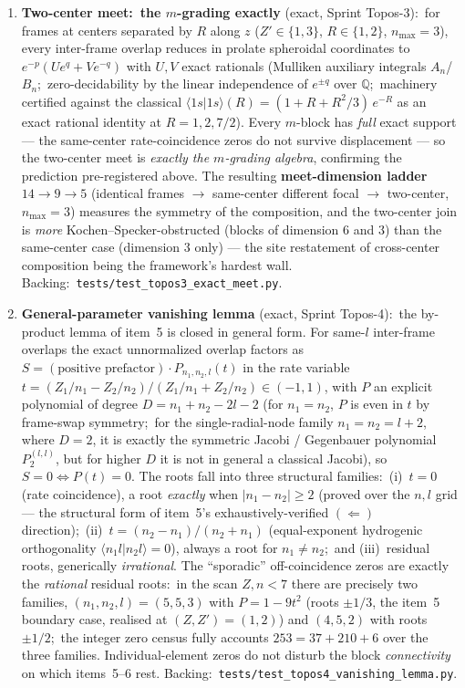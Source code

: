 \documentclass[11pt,a4paper]{article}
\theoremstyle{plain}
\theoremstyle{definition}
\newcommand{\Q}{\mathbb{Q}}
\begin{document}
\begin{enumerate}
  \item \textbf{Two-center meet:\ the $m$-grading exactly} (exact,
    Sprint Topos-3):\ for frames at centers separated by $R$ along $z$
    ($Z' \in \{1, 3\}$, $R \in \{1, 2\}$, $n_{\max} = 3$), every
    inter-frame overlap reduces in prolate spheroidal coordinates to
    $e^{-p}(U e^{q} + V e^{-q})$ with $U, V$ exact rationals
    (Mulliken auxiliary integrals $A_n$/$B_n$;\ zero-decidability by
    the linear independence of $e^{\pm q}$ over $\Q$;\ machinery
    certified against the classical $\langle 1s|1s\rangle(R) =
    (1 + R + R^2/3)\,e^{-R}$ as an exact rational identity at
    $R = 1, 2, 7/2$).  Every $m$-block has \emph{full} exact support
    --- the same-center rate-coincidence zeros do not survive
    displacement --- so the two-center meet is \emph{exactly the
    $m$-grading algebra}, confirming the prediction pre-registered
    above.  The resulting \textbf{meet-dimension ladder}
    $14 \to 9 \to 5$ (identical frames $\to$ same-center different
    focal $\to$ two-center, $n_{\max} = 3$) measures the symmetry of
    the composition, and the two-center join is \emph{more}
    Kochen--Specker-obstructed (blocks of dimension $6$ and $3$) than
    the same-center case (dimension $3$ only) --- the site restatement
    of cross-center composition being the framework's hardest wall.
    Backing:\ \texttt{tests/test\_topos3\_exact\_meet.py}.
  \item \textbf{General-parameter vanishing lemma} (exact, Sprint
    Topos-4):\ the by-product lemma of item~5 is closed in general
    form.  For same-$l$ inter-frame overlaps the exact unnormalized
    overlap factors as $S = (\text{positive prefactor}) \cdot
    P_{n_1, n_2, l}(t)$ in the rate variable
    $t = (Z_1/n_1 - Z_2/n_2)/(Z_1/n_1 + Z_2/n_2) \in (-1, 1)$, with
    $P$ an explicit polynomial of degree $D = n_1 + n_2 - 2l - 2$
    (for $n_1 = n_2$, $P$ is even in $t$ by frame-swap symmetry;\ for
    the single-radial-node family $n_1 = n_2 = l + 2$, where $D = 2$, it
    is exactly the symmetric Jacobi / Gegenbauer polynomial $P_2^{(l,l)}$,
    but for higher $D$ it is not in general a classical Jacobi), so
    $S = 0 \Leftrightarrow P(t) = 0$.  The roots
    fall into three structural families:\ (i)~$t = 0$ (rate
    coincidence), a root \emph{exactly} when $|n_1 - n_2| \ge 2$
    (proved over the $n, l$ grid --- the structural form of item~5's
    exhaustively-verified $(\Leftarrow)$ direction);\ (ii)~$t =
    (n_2 - n_1)/(n_2 + n_1)$ (equal-exponent hydrogenic orthogonality
    $\langle n_1 l | n_2 l \rangle = 0$), always a root for
    $n_1 \ne n_2$;\ and (iii)~residual roots, generically
    \emph{irrational}.  The ``sporadic'' off-coincidence zeros are
    exactly the \emph{rational} residual roots:\ in the scan $Z, n < 7$
    there are precisely two families, $(n_1, n_2, l) = (5, 5, 3)$ with
    $P = 1 - 9 t^2$ (roots $\pm 1/3$, the item~5 boundary case,
    realised at $(Z, Z') = (1, 2)$) and $(4, 5, 2)$ with roots
    $\pm 1/2$;\ the integer zero census fully accounts $253 = 37 +
    210 + 6$ over the three families.  Individual-element zeros do not
    disturb the block \emph{connectivity} on which items~5--6 rest.
    Backing:\ \texttt{tests/test\_topos4\_vanishing\_lemma.py}.
\end{enumerate}
\end{document}
